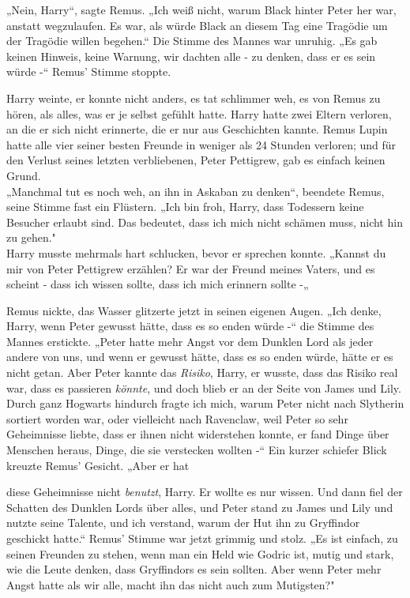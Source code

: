 {„Nein, Harry“, sagte Remus. „Ich weiß nicht, warum Black hinter Peter her war, anstatt wegzulaufen. Es war, als würde Black an diesem Tag eine Tragödie um der Tragödie willen begehen.“ Die Stimme des Mannes war unruhig. „Es gab keinen Hinweis, keine Warnung, wir dachten alle - zu denken, dass er es sein würde -“ Remus' Stimme stoppte.

Harry weinte, er konnte nicht anders, es tat schlimmer weh, es von Remus zu hören, als alles, was er je selbst gefühlt hatte. Harry hatte zwei Eltern verloren, an die er sich nicht erinnerte, die er nur aus Geschichten kannte. Remus Lupin hatte alle vier seiner besten Freunde in weniger als 24 Stunden verloren; und für den Verlust seines letzten verbliebenen, Peter Pettigrew, gab es einfach keinen Grund.\\ „Manchmal tut es noch weh, an ihn in Askaban zu denken“, beendete Remus, seine Stimme fast ein Flüstern. „Ich bin froh, Harry, dass Todessern keine Besucher erlaubt sind. Das bedeutet, dass ich mich nicht schämen muss, nicht hin zu gehen."\\ Harry musste mehrmals hart schlucken, bevor er sprechen konnte. „Kannst du mir von Peter Pettigrew erzählen? Er war der Freund meines Vaters, und es scheint - dass ich wissen sollte, dass ich mich erinnern sollte -„

Remus nickte, das Wasser glitzerte jetzt in seinen eigenen Augen. „Ich denke, Harry, wenn Peter gewusst hätte, dass es so enden würde -“ die Stimme des Mannes erstickte. „Peter hatte mehr Angst vor dem Dunklen Lord als jeder andere von uns, und wenn er gewusst hätte, dass es so enden würde, hätte er es nicht getan. Aber Peter kannte das \emph{Risiko}, Harry, er wusste, dass das Risiko real war, dass es passieren \emph{könnte}, und doch blieb er an der Seite von James und Lily. Durch ganz Hogwarts hindurch fragte ich mich, warum Peter nicht nach Slytherin sortiert worden war, oder vielleicht nach Ravenclaw, weil Peter so sehr Geheimnisse liebte, dass er ihnen nicht widerstehen konnte, er fand Dinge über Menschen heraus, Dinge, die sie verstecken wollten -“ Ein kurzer schiefer Blick kreuzte Remus' Gesicht. „Aber er hat

diese Geheimnisse nicht \emph{benutzt}, Harry. Er wollte es nur wissen. Und dann fiel der Schatten des Dunklen Lords über alles, und Peter stand zu James und Lily und nutzte seine Talente, und ich verstand, warum der Hut ihn zu Gryffindor geschickt hatte.“ Remus' Stimme war jetzt grimmig und stolz. „Es ist einfach, zu seinen Freunden zu stehen, wenn man ein Held wie Godric ist, mutig und stark, wie die Leute denken, dass Gryffindors es sein sollten. Aber wenn Peter mehr Angst hatte als wir alle, macht ihn das nicht auch zum Mutigsten?"

}
